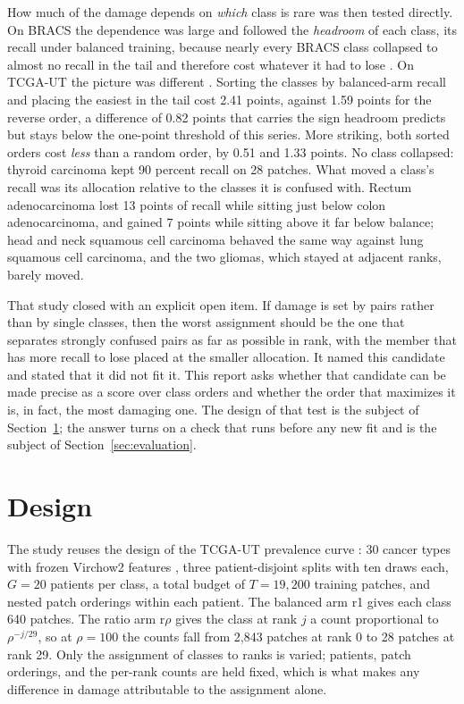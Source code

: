 \documentclass[11pt]{article}
\begin{document}
How much of the damage depends on \emph{which} class is rare was then tested directly. On BRACS the dependence was large and followed the \emph{headroom} of each class, its recall under balanced training, because nearly every BRACS class collapsed to almost no recall in the tail and therefore cost whatever it had to lose \citep{queisler2026tailBracs}. On TCGA-UT the picture was different \citep{queisler2026tailTcga}. Sorting the classes by balanced-arm recall and placing the easiest in the tail cost 2.41 points, against 1.59 points for the reverse order, a difference of 0.82 points that carries the sign headroom predicts but stays below the one-point threshold of this series. More striking, both sorted orders cost \emph{less} than a random order, by 0.51 and 1.33 points. No class collapsed: thyroid carcinoma kept 90 percent recall on 28 patches. What moved a class's recall was its allocation relative to the classes it is confused with. Rectum adenocarcinoma lost 13 points of recall while sitting just below colon adenocarcinoma, and gained 7 points while sitting above it far below balance; head and neck squamous cell carcinoma behaved the same way against lung squamous cell carcinoma, and the two gliomas, which stayed at adjacent ranks, barely moved.

That study closed with an explicit open item. If damage is set by pairs rather than by single classes, then the worst assignment should be the one that separates strongly confused pairs as far as possible in rank, with the member that has more recall to lose placed at the smaller allocation. It named this candidate and stated that it did not fit it. This report asks whether that candidate can be made precise as a score over class orders and whether the order that maximizes it is, in fact, the most damaging one. The design of that test is the subject of Section~\ref{sec:design}; the answer turns on a check that runs before any new fit and is the subject of Section~\ref{sec:evaluation}.

\section{Design}
\label{sec:design}
The study reuses the design of the TCGA-UT prevalence curve \citep{queisler2026prevalenceTcga}: 30 cancer types with frozen Virchow2 features \citep{zimmermann2024virchow2}, three patient-disjoint splits with ten draws each, $G=20$ patients per class, a total budget of $T=19{,}200$ training patches, and nested patch orderings within each patient. The balanced arm r1 gives each class 640 patches. The ratio arm r$\rho$ gives the class at rank $j$ a count proportional to $\rho^{-j/29}$, so at $\rho=100$ the counts fall from 2,843 patches at rank 0 to 28 patches at rank 29. Only the assignment of classes to ranks is varied; patients, patch orderings, and the per-rank counts are held fixed, which is what makes any difference in damage attributable to the assignment alone.
\end{document}
